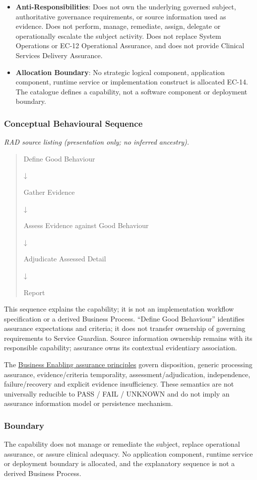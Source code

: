 \begin{itemize}
\item
\textbf{Anti-Responsibilities}: Does not own the underlying governed subject, authoritative governance requirements, or source information used as evidence. Does not perform, manage, remediate, assign, delegate or operationally escalate the subject activity. Does not replace System Operations or EC-12 Operational Assurance, and does not provide Clinical Services Delivery Assurance.



\item
\textbf{Allocation Boundary}: No strategic logical component, application component, runtime service or implementation construct is allocated EC-14. The catalogue defines a capability, not a software component or deployment boundary.



\end{itemize}
\subsubsection*{Conceptual Behavioural Sequence}

\textit{RAD source listing (presentation only; no inferred ancestry).}
\begin{quote}
Define Good Behaviour

↓

Gather Evidence

↓

Assess Evidence against Good Behaviour

↓

Adjudicate Assessed Detail

↓

Report
\end{quote}

This sequence explains the capability; it is not an implementation workflow specification or a derived Business Process. “Define Good Behaviour” identifies assurance expectations and criteria; it does not transfer ownership of governing requirements to Service Guardian. Source information ownership remains with its responsible capability; assurance owns its contextual evidentiary association.


The \hyperref[rad:enabling:674]{Business Enabling assurance principles} govern disposition, generic processing assurance, evidence/\allowbreak{}criteria temporality, assessment/\allowbreak{}adjudication, independence, failure/\allowbreak{}recovery and explicit evidence insufficiency. These semantics are not universally reducible to PASS /\allowbreak{} FAIL /\allowbreak{} UNKNOWN and do not imply an assurance information model or persistence mechanism.


\par\smallskip
\subsubsection*{Boundary}

The capability does not manage or remediate the subject, replace operational assurance, or assure clinical adequacy. No application component, runtime service or deployment boundary is allocated, and the explanatory sequence is not a derived Business Process.
